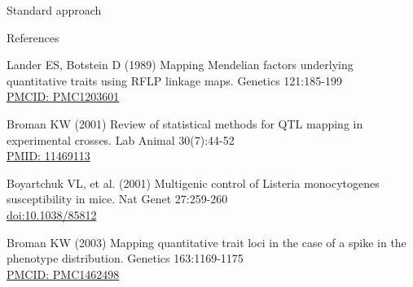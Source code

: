 \documentclass[aspectratio=169,12pt,t]{beamer}
\begin{document}
\begin{frame}{Standard approach}

\note{
}

\end{frame}




\begin{frame}{References}
\vspace{-7mm}

  \bbi

\item Lander ES, Botstein D (1989) Mapping Mendelian factors
  underlying quantitative traits using RFLP linkage maps. Genetics
  121:185-199 \\
  \href{https://www.ncbi.nlm.nih.gov/pmc/articles/PMC1203601}{\footnotesize
    PMCID: PMC1203601}

\item Broman KW (2001) Review of statistical methods for QTL mapping
  in experimental crosses. Lab Animal 30(7):44-52 \\
  \href{https://www.ncbi.nlm.nih.gov/pubmed/11469113}{\footnotesize
    PMID: 11469113}

\item Boyartchuk VL, et al. (2001) Multigenic control of Listeria monocytogenes
  susceptibility in mice. Nat Genet 27:259-260 \\
  \href{https://doi.org/10.1038/85812}{\footnotesize doi:10.1038/85812}

\item Broman KW (2003) Mapping quantitative trait loci in the case
  of a spike in the phenotype distribution. Genetics 163:1169-1175 \\
  \href{https://www.ncbi.nlm.nih.gov/pmc/articles/PMC1462498}{\footnotesize
    PMCID: PMC1462498}

\ei




\end{frame}
\end{document}
